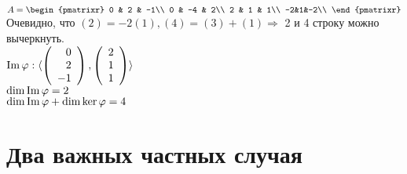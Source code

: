 $A = \begin{pmatrixr}
0 & 2 & -1\\
0 & -4 & 2\\
2 & 1 & 1\\
-2&1&-2\\ \end{pmatrixr}$ \\
Очевидно, что $(2) = -2(1), (4) = (3)+(1) \Rightarrow$ 2 и 4 строку можно вычеркнуть. \\
$\operatorname{\mathop{Im}}\varphi :\langle \left( \begin{array}{r}
0\\
2\\
-1
\end{array}\right), \left( \begin{array}{r}
2\\
1\\
1
\end{array}\right) \rangle$\\
$\dim \operatorname{\mathop{Im}}\varphi = 2$\\
$\dim \operatorname{\mathop{Im}} \varphi +\dim \ker \varphi =4$




\section{Два важных частных случая}

